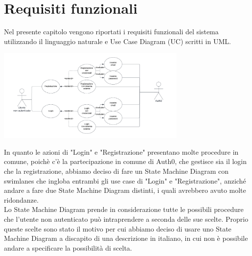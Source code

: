 \section{Requisiti funzionali}
\label{secD2:RequisitiFunzionali}

Nel presente capitolo vengono riportati i requisiti funzionali del sistema utilizzando il linguaggio naturale e Use Case Diagram (UC) scritti in UML.

\begin{listaPersonale}[UC]{}

    \begin{center}
        \includegraphics[width=0.7\textwidth]{img/Diagrammi/UseCases/AccessoRegistrazione.png}
    \end{center}
    In quanto le azioni di "Login" e "Registrazione" presentano molte procedure in comune, poichè c'è la partecipazione in comune di Auth0, che gestisce sia il login che la registrazione, abbiamo deciso di fare un State Machine Diagram con swimlanes che ingloba entrambi gli use case di "Login" e "Registrazione", anziché andare a fare due State Machine Diagram distinti, i quali avrebbero avuto molte ridondanze. \\ Lo State Machine Diagram prende in considerazione tutte le possibili procedure che l'utente non autenticato  può intraprendere a seconda delle sue scelte. Proprio queste scelte sono stato il motivo per cui abbiamo deciso di usare uno State Machine Diagram a discapito di una descrizione in italiano, in cui non è possibile andare a specificare la possibilità di scelta.


\end{listaPersonale}
